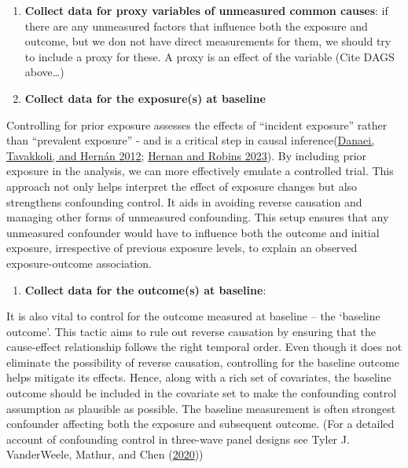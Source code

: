 \documentclass[
  singlecolumn]{report}
\providecommand{\tightlist}{%
  \setlength{\itemsep}{0pt}\setlength{\parskip}{0pt}}\usepackage{longtable,booktabs,array}
\begin{document}
\begin{enumerate}
\def\labelenumi{\arabic{enumi}.}
\setcounter{enumi}{5}
\item
  \textbf{Collect data for proxy variables of unmeasured common causes}:
  if there are any unmeasured factors that influence both the exposure
  and outcome, but we don not have direct measurements for them, we
  should try to include a proxy for these. A proxy is an effect of the
  variable (Cite DAGS above\ldots)
\item
  \textbf{Collect data for the exposure(s) at baseline}
\end{enumerate}

Controlling for prior exposure assesses the effects of ``incident
exposure'' rather than ``prevalent exposure'' - and is a critical step
in causal inference(\protect\hyperlink{ref-danaei2012}{Danaei,
Tavakkoli, and Hernán 2012}; \protect\hyperlink{ref-hernan2023}{Hernan
and Robins 2023}). By including prior exposure in the analysis, we can
more effectively emulate a controlled trial. This approach not only
helps interpret the effect of exposure changes but also strengthens
confounding control. It aids in avoiding reverse causation and managing
other forms of unmeasured confounding. This setup ensures that any
unmeasured confounder would have to influence both the outcome and
initial exposure, irrespective of previous exposure levels, to explain
an observed exposure-outcome association.

\begin{enumerate}
\def\labelenumi{\arabic{enumi}.}
\setcounter{enumi}{7}
\tightlist
\item
  \textbf{Collect data for the outcome(s) at baseline}:
\end{enumerate}

It is also vital to control for the outcome measured at baseline -- the
`baseline outcome'. This tactic aims to rule out reverse causation by
ensuring that the cause-effect relationship follows the right temporal
order. Even though it does not eliminate the possibility of reverse
causation, controlling for the baseline outcome helps mitigate its
effects. Hence, along with a rich set of covariates, the baseline
outcome should be included in the covariate set to make the confounding
control assumption as plausible as possible. The baseline measurement is
often strongest confounder affecting both the exposure and subsequent
outcome. (For a detailed account of confounding control in three-wave
panel designs see Tyler J. VanderWeele, Mathur, and Chen
(\protect\hyperlink{ref-vanderweele2020}{2020}))
\end{document}

